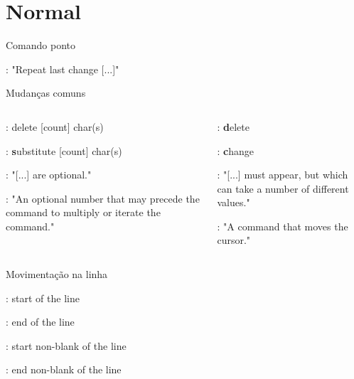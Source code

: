 \section{Normal}
\begin{frame}{Comando ponto}
    \begin{widedescription}
    \centering
        \item {}: "Repeat last change [...]"
    \end{widedescription}
\end{frame}

\begin{frame}{Mudanças comuns}
    \begin{columns}
        \begin{column}{0.5\textwidth}
            \begin{widedescription}
                \item {}: delete [count] char(s)
                \item {}: \textbf{s}ubstitute [count] char(s)
                \item \key{[]}: "[...] are optional."
                \item \key{[count]}: "An optional number that may precede the command to multiply or iterate the command."
            \end{widedescription}
        \end{column}
        
        \begin{column}{0.5\textwidth}
            \begin{widedescription}
                \item {}: \textbf{d}elete
                \item {}: \textbf{c}hange
                \item \key{\bk{}}: "[...] must appear, but which can take a number of different values."
                \item {}:  "A command that moves the cursor."
            \end{widedescription}
        \end{column}
    \end{columns}
\end{frame}

\begin{frame}{Movimentação na linha}
    \begin{widedescription}
        \item {}: start of the line
        \item \key{\$}: end of the line
        \item \key{\^{}}: start non-blank of the line
        \item {}: end non-blank of the line
    \end{widedescription}
\end{frame}

